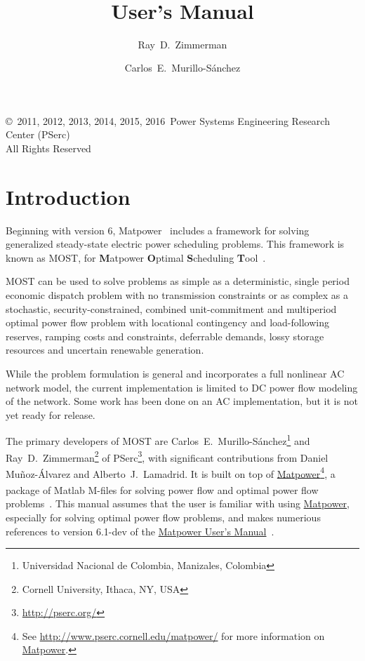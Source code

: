 \documentclass[12pt]{article}
\title{\mostname{}\\\most{} \mostver{}\\
User's Manual}
\author{Ray~D.~Zimmerman \and Carlos~E.~Murillo-S\'anchez}
\newcommand{\mpver}[0]{6.1-dev}
\newcommand{\matlab}[0]{{\sc Matlab}}
\newcommand{\matpower}[0]{{\sc Matpower}}
\newcommand{\matpowerurl}[0]{http://www.pserc.cornell.edu/matpower/}
\newcommand{\matpowerlink}[0]{\href{\matpowerurl}{\matpower{}}}
\newcommand{\most}[0]{{MOST}}
\newcommand{\mostname}[0]{{{\bf M}{\sc atpower} \textbf{O}ptimal \textbf{S}cheduling \textbf{T}ool}}
\newcommand{\pserc}[0]{{\sc PSerc}}
\newcommand{\PSERC}[0]{{Power Systems Engineering Research Center (\pserc{})}}
\newcommand{\mumurl}[0]{http://www.pserc.cornell.edu/matpower/docs/MATPOWER-manual-\mpver.pdf}
\newcommand{\mum}[0]{\href{\mumurl}{\matpower{} User's Manual}}
\numberwithin{equation}{section}
\numberwithin{table}{section}
\numberwithin{figure}{section}
\begin{document}
\maketitle
\thispagestyle{empty}
\vfill
\begin{center}
{\scriptsize
\copyright~2011, 2012, 2013, 2014, 2015, 2016~\PSERC{}\\
All Rights Reserved}
\end{center}

\clearpage
\tableofcontents
\clearpage
\listoffigures
\listoftables

\clearpage
\section{Introduction}

Beginning with version 6, \matpower{}~\cite{zimmerman2011} includes a framework for solving generalized steady-state electric power scheduling problems. This framework is known as \most{}, for \mostname{}~\cite{murillo-sanchez2013a}.

\most{} can be used to solve problems as simple as a deterministic, single period economic dispatch problem with no transmission constraints or as complex as a stochastic, security-constrained, combined unit-commitment and multiperiod optimal power flow problem with locational contingency and load-following reserves, ramping costs and constraints, deferrable demands, lossy storage resources and uncertain renewable generation.

While the problem formulation is general and incorporates a full nonlinear AC network model, the current implementation is limited to DC power flow modeling of the network. Some work has been done on an AC implementation, but it is not yet ready for release.

The primary developers of \most{} are Carlos~E.~Murillo-S\'anchez\footnote{Universidad Nacional de Colombia, Manizales, Colombia} and Ray~D.~Zimmerman\footnote{Cornell University, Ithaca, NY, USA} of \pserc{}\footnote{\url{http://pserc.org/}}, with significant contributions from Daniel Mu\~noz-\'Alvarez and Alberto~J.~Lamadrid. It is built on top of \matpowerlink{}\footnote{See \url{\matpowerurl} for more information on \matpowerlink{}.}, a package of \matlab{}\textsuperscript{\tiny \textregistered} M-files for solving power flow and optimal power flow problems~\cite{zimmerman2011, zimmerman2009}. This manual assumes that the user is familiar with using \matpowerlink{}, especially for solving optimal power flow problems, and makes numerious references to version \mpver{} of the \mum{}~\cite{matpower}.
\end{document}
